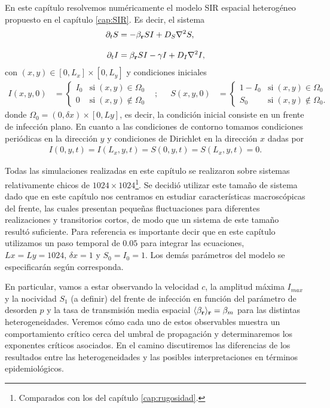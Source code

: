 \graphicspath{{figs/cap5}}
\vspace*{-.3cm}
En este capítulo resolvemos numéricamente el modelo SIR espacial heterogéneo propuesto en el capítulo \ref{cap:SIR}. Es decir, el sistema
\begin{align}
    \partial_t S &=-\beta_{\vb r} SI + D_{S} \laplacian{S},\label{Seqdif}\\[.3cm]
    \partial_t I &=\beta_{\vb r} SI - \gamma I + D_{I} \laplacian{I},\label{Ieqdif}
\end{align}
con $(x,y) \in [0,L_x]\times[0,L_y]$ y condiciones iniciales
\begin{align*}
    I(x,y,0) &= 
    \begin{cases}
    I_0 & \text{si} \; (x,y) \in \Omega_0 \\
    0 & \text{si} \; (x,y) \notin \Omega_0  
    \end{cases}
    & ;&&
    S(x,y,0) &=
    \begin{cases}
    1-I_0 & \text{si} \; (x,y) \in \Omega_0 \\
    S_0 & \text{si} \; (x,y) \notin \Omega_0.
    \end{cases}
\end{align*}
donde $\Omega_0 = (0,\delta x) \times [0,Ly]$, es decir, la condición inicial consiste en un frente de infección plano. En cuanto a las condiciones de contorno tomamos condiciones periódicas en la dirección $y$ y condiciones de Dirichlet en la dirección $x$ dadas por
\begin{align*}
    I(0,y,t)=I(L_x,y,t)=S(0,y,t)=S(L_x,y,t)=0.
\end{align*}

Todas las simulaciones realizadas en este capítulo se realizaron sobre sistemas relativamente chicos de $1024\times 1024$\footnote{Comparados con los del capítulo \ref{cap:rugosidad}.}. Se decidió utilizar este tamaño de sistema dado que en este capítulo nos centramos en estudiar características macroscópicas del frente, las cuales presentan pequeñas fluctuaciones para diferentes realizaciones y transitorios cortos, de modo que un sistema de este tamaño resultó suficiente. Para referencia es importante decir que en este capítulo utilizamos un paso temporal de $0.05$ para integrar las ecuaciones, $Lx=Ly=1024$, $\delta x=1$ y $S_0=I_0=1$. Los demás parámetros del modelo se especificarán según corresponda.

En particular, vamos a estar observando la velocidad $c$, la amplitud máxima $I_{max}$ y la nocividad $S_1$ (a definir) del frente de infección en función del parámetro de desorden $p$ y la tasa de transmisión media espacial $\langle\beta_{\vb r}\rangle_{\vb r}=\beta_m$ para las distintas heterogeneidades. Veremos cómo cada uno de estos observables muestra un comportamiento crítico cerca del umbral de propagación y determinaremos los exponentes críticos asociados. En el camino discutiremos las diferencias de los resultados entre las heterogeneidades y las posibles interpretaciones en términos epidemiológicos. 

